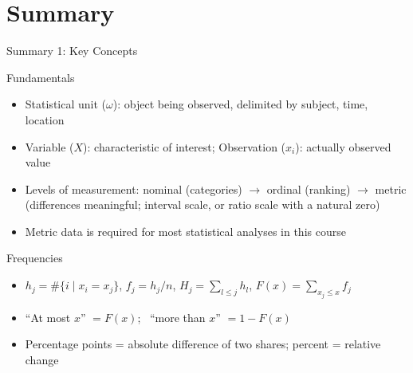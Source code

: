\documentclass[aspectratio=169,11pt]{beamer}
\begin{document}

\section{Summary}

\begin{frame}{Summary 1: Key Concepts}
  \begin{block}{Fundamentals}
    \begin{itemize}
      \item Statistical unit ($\omega$): object being observed, delimited by subject, time, location
      \item Variable ($X$): characteristic of interest; Observation ($x_i$): actually observed value
      \item Levels of measurement: nominal (categories) $\to$ ordinal (ranking) $\to$ metric (differences
            meaningful; interval scale, or ratio scale with a natural zero)
      \item Metric data is required for most statistical analyses in this course
    \end{itemize}
  \end{block}

  \begin{block}{Frequencies}
    \begin{itemize}
      \item $h_j = \#\{i \mid x_i = x_j\}$, \quad $f_j = h_j / n$, \quad $H_j = \sum_{l \le j} h_l$,
            \quad $F(x) = \sum_{x_j \leq x} f_j$
      \item ``At most $x$'' $= F(x)$; \ ``more than $x$'' $= 1 - F(x)$
      \item Percentage points = absolute difference of two shares; percent = relative change
    \end{itemize}
  \end{block}
\end{frame}
\end{document}
